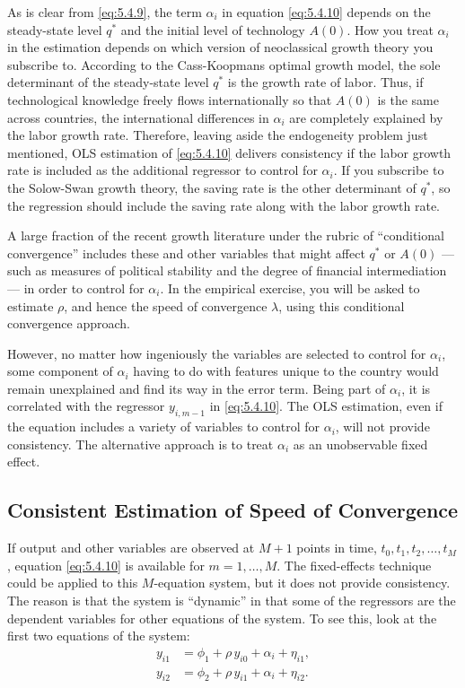 As is clear from \eqref{eq:5.4.9}, the term $\alpha_i$ in equation \eqref{eq:5.4.10} depends on the steady-state
level $q^*$ and the initial level of technology $A(0)$. How you treat $\alpha_i$ in the
estimation depends on which version of neoclassical growth theory you subscribe
to. According to the Cass-Koopmans optimal growth model, the sole determinant
of the steady-state level $q^*$ is the growth rate of labor. Thus, if technological
knowledge freely flows internationally so that $A(0)$ is the same across countries,
the international differences in $\alpha_i$ are completely explained by the labor growth
rate. Therefore, leaving aside the endogeneity problem just mentioned, OLS estimation
of \eqref{eq:5.4.10} delivers consistency if the labor growth rate is included as the
additional regressor to control for $\alpha_i$. If you subscribe to the Solow-Swan growth
theory, the saving rate is the other determinant of $q^*$, so the regression should
include the saving rate along with the labor growth rate.

A large fraction of the recent growth literature under the rubric of ``conditional
convergence'' includes these and other variables that might affect $q^*$ or $A(0)$ ---
such as measures of political stability and the degree of financial intermediation ---
in order to control for $\alpha_i$. In the empirical exercise, you will be asked to estimate
$\rho$, and hence the speed of convergence $\lambda$, using this conditional convergence
approach.

However, no matter how ingeniously the variables are selected to control for
$\alpha_i$, some component of $\alpha_i$ having to do with features unique to the country would
remain unexplained and find its way in the error term. Being part of $\alpha_i$, it is correlated
with the regressor $y_{i,m-1}$ in \eqref{eq:5.4.10}. The OLS estimation, even if the equation
includes a variety of variables to control for $\alpha_i$, will not provide consistency. The
alternative approach is to treat $\alpha_i$ as an unobservable fixed effect.

\subsection*{Consistent Estimation of Speed of Convergence}

If output and other variables are observed at $M + 1$ points in time,
$t_0, t_1, t_2, \ldots, t_M$,
equation \eqref{eq:5.4.10} is available for $m = 1, \ldots, M$. The fixed-effects technique could
be applied to this $M$-equation system, but it does not provide consistency. The reason
is that the system is ``dynamic'' in that some of the regressors are the dependent
variables for other equations of the system. To see this, look at the first two equations
of the system:
\begin{align*}
  y_{i1} &= \phi_1 + \rho\, y_{i0} + \alpha_i + \eta_{i1}, \\
  y_{i2} &= \phi_2 + \rho\, y_{i1} + \alpha_i + \eta_{i2}.
\end{align*}

